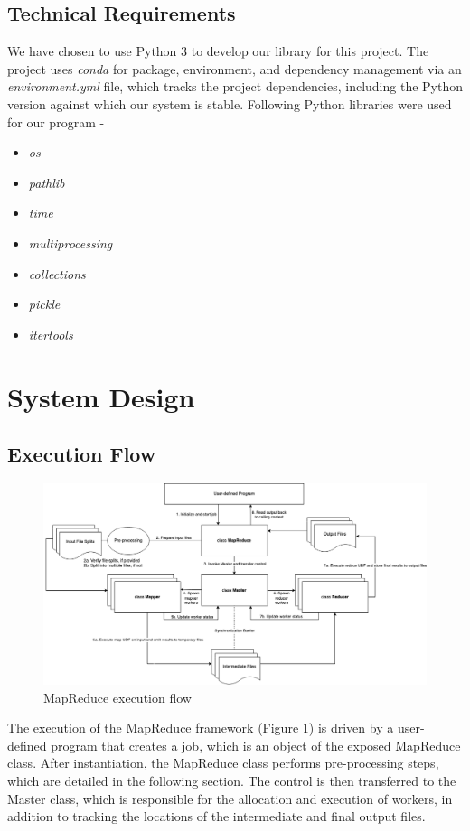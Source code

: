 \documentclass[a4paper,12pt]{article}
\begin{document}
\subsection{Technical Requirements}
We have chosen to use Python 3 to develop our library for this project. The project uses \emph{conda} for package, environment, and dependency management via an \textit{environment.yml} file, which tracks the project dependencies, including the Python version against which our system is stable. Following Python libraries were used for our program - 
\begin{itemize}
    \item \textit{os}
    \item \textit{pathlib}
    \item \textit{time}
    \item \textit{multiprocessing}
    \item \textit{collections}
    \item \textit{pickle}
    \item \textit{itertools}
\end{itemize}

\section{System Design}

\subsection{Execution Flow}
    \begin{figure}[H]
        \includegraphics[width=\textwidth]{mapreduce_flow}
        \caption{MapReduce execution flow}
    \end{figure}
The execution of the MapReduce framework (Figure 1) is driven by a user-defined program that creates a job, which is an object of the exposed MapReduce class. After instantiation, the MapReduce class performs pre-processing steps, which are detailed in the following section. The control is then transferred to the Master class, which is responsible for the allocation and execution of workers, in addition to tracking the locations of the intermediate and final output files. \newline
\end{document}
